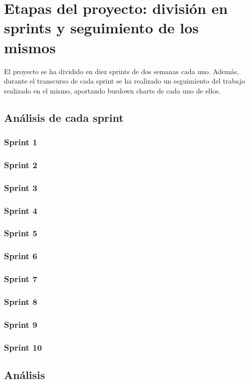 \chapter{Etapas del proyecto: división en sprints y seguimiento de los mismos}\label{chapter:sprints}

El proyecto se ha dividido en diez sprints de dos semanas cada uno. Además, durante el transcurso de cada sprint se ha realizado un seguimiento del trabajo realizado en el mismo, aportando burdown charts de cada uno de ellos.

\section{Análisis de cada sprint}
\subsection{Sprint 1}
\subsection{Sprint 2}
\subsection{Sprint 3}
\subsection{Sprint 4}
\subsection{Sprint 5}
\subsection{Sprint 6}
\subsection{Sprint 7}
\subsection{Sprint 8}
\subsection{Sprint 9}
\subsection{Sprint 10}

\section{Análisis}